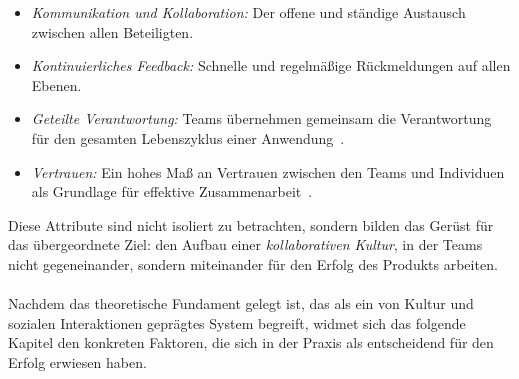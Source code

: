\begin{itemize}
	\item \emph{Kommunikation und Kollaboration:} Der offene und ständige Austausch zwischen allen Beteiligten.
	\item \emph{Kontinuierliches Feedback:} Schnelle und regelmäßige Rückmeldungen auf allen Ebenen.
	\item \emph{Geteilte Verantwortung:} Teams übernehmen gemeinsam die Verantwortung für den gesamten Lebenszyklus einer Anwendung~\cite[284\psq]{kar24}.
	\item \emph{Vertrauen:} Ein hohes Maß an Vertrauen zwischen den Teams und Individuen als Grundlage für effektive Zusammenarbeit~\cite[8]{aza23}.
\end{itemize}
Diese Attribute sind nicht isoliert zu betrachten, sondern bilden das Gerüst für das übergeordnete Ziel: den Aufbau einer \emph{kollaborativen Kultur}, in der Teams nicht gegeneinander, sondern miteinander für den Erfolg des Produkts arbeiten.

\paragraph{}
Nachdem das theoretische Fundament gelegt ist, das \DO als ein von Kultur und sozialen Interaktionen geprägtes System begreift, widmet sich das folgende Kapitel den konkreten Faktoren, die sich in der Praxis als entscheidend für den Erfolg erwiesen haben.